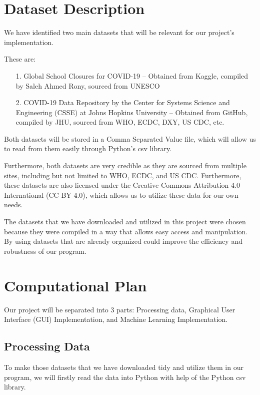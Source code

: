 \documentclass[fontsize=11pt]{article}
\begin{document}
\section*{Dataset Description}

We have identified two main datasets that will be relevant for our project’s implementation.

These are:

\begin{enumerate}
    \item [1. ]
          Global School Closures for COVID-19 – Obtained from Kaggle, compiled by Saleh Ahmed Rony, sourced from UNESCO

    \item [2. ]
          COVID-19 Data Repository by the Center for Systems Science and Engineering (CSSE) at Johns Hopkins University – Obtained from GitHub, compiled by JHU, sourced from WHO, ECDC, DXY, US CDC, etc.
\end{enumerate}

Both datasets will be stored in a Comma Separated Value file, which will allow us to read from them easily through Python’s csv library.

Furthermore, both datasets are very credible as they are sourced from multiple sites, including but not limited to WHO, ECDC, and US CDC. Furthermore, these datasets are also licensed under the Creative Commons Attribution 4.0 International (CC BY 4.0), which allows us to utilize these data for our own needs.

The datasets that we have downloaded and utilized in this project were chosen because they were compiled in a way that allows easy access and manipulation. By using datasets that are already organized could improve the efficiency and robustness of our program.

\newpage


\section*{Computational Plan}

Our project will be separated into 3 parts: Processing data, Graphical User Interface (GUI) Implementation, and Machine Learning Implementation.

\subsection*{Processing Data}

To make those datasets that we have downloaded tidy and utilize them in our program, we will firstly read the data into Python with help of the Python csv library.
\end{document}
